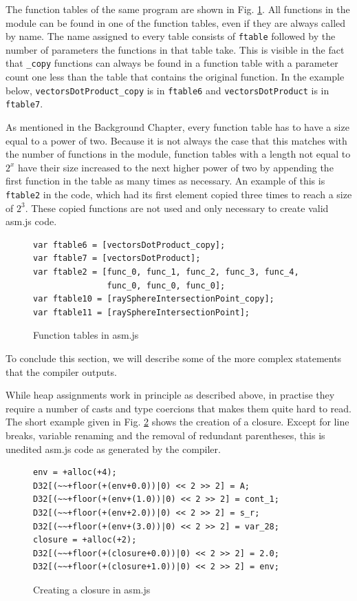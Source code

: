 \documentclass[11pt]{report}
\begin{document}
The function tables of the same program are shown in Fig. \ref{iasmjsmm6}. All functions in the module can be found in one of the function tables, even if they are always called by name. The name assigned to every table consists of \texttt{ftable} followed by the number of parameters the functions in that table take. This is visible in the fact that \texttt{_copy} functions can always be found in a function table with a parameter count one less than the table that contains the original function. In the example below, \texttt{vectorsDotProduct_copy} is in \texttt{ftable6} and \texttt{vectorsDotProduct} is in \texttt{ftable7}.

As mentioned in the Background Chapter, every function table has to have a size equal to a power of two. Because it is not always the case that this matches with the number of functions in the module, function tables with a length not equal to $2^x$ have their size increased to the next higher power of two by appending the first function in the table as many times as necessary. An example of this is \texttt{ftable2} in the code, which had its first element copied three times to reach a size of $2^3$. These copied functions are not used and only necessary to create valid asm.js code.

\begin{figure}[t]
\begin{lstlisting}
var ftable6 = [vectorsDotProduct_copy];
var ftable7 = [vectorsDotProduct];
var ftable2 = [func_0, func_1, func_2, func_3, func_4,
               func_0, func_0, func_0];
var ftable10 = [raySphereIntersectionPoint_copy];
var ftable11 = [raySphereIntersectionPoint];
\end{lstlisting}
\caption{Function tables in asm.js}
\label{iasmjsmm6}
\end{figure}

To conclude this section, we will describe some of the more complex statements that the compiler outputs.

While heap assignments work in principle as described above, in practise they require a number of casts and type coercions that makes them quite hard to read. The short example given in Fig. \ref{iasmjsmm7} shows the creation of a closure. Except for line breaks, variable renaming and the removal of redundant parentheses, this is unedited asm.js code as generated by the compiler.

\begin{figure}[ht]
\begin{lstlisting}
env = +alloc(+4);
D32[(~~+floor(+(env+0.0))|0) << 2 >> 2] = A;
D32[(~~+floor(+(env+(1.0))|0) << 2 >> 2] = cont_1;
D32[(~~+floor(+(env+2.0))|0) << 2 >> 2] = s_r;
D32[(~~+floor(+(env+(3.0))|0) << 2 >> 2] = var_28;
closure = +alloc(+2);
D32[(~~+floor(+(closure+0.0))|0) << 2 >> 2] = 2.0;
D32[(~~+floor(+(closure+1.0))|0) << 2 >> 2] = env;
\end{lstlisting}
\caption{Creating a closure in asm.js}
\label{iasmjsmm7}
\end{figure}
\end{document}

